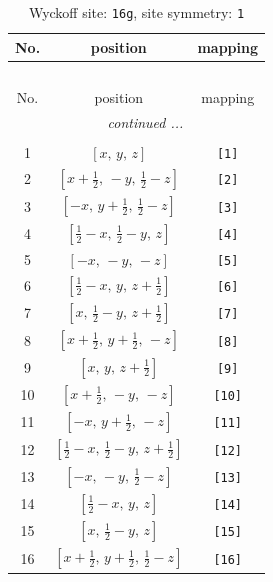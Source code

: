 \documentclass[fleqn,8pt]{jsarticle}
\begin{document}
\begin{longtable}{ccc}
\caption{Wyckoff site: {\tt 16g}, site symmetry: {\tt 1}}
 \\
 \hline \hline
No. & position & mapping \\ \hline \endfirsthead

\multicolumn{2}{l}{\tablename\ \thetable{}} \\
 \hline \hline
No. & position & mapping \\ \hline \endhead

 \hline \hline
\multicolumn{2}{r}{\footnotesize\it continued ...} \\ \endfoot

 \hline \hline
\multicolumn{2}{r}{} \\ \endlastfoot

1 & $\left[ x,\, y,\, z \right]$ & {\tt [1]} \\ \hline
2 & $\left[ x + \frac{1}{2},\, - y,\, \frac{1}{2} - z \right]$ & {\tt [2]} \\ \hline
3 & $\left[ - x,\, y + \frac{1}{2},\, \frac{1}{2} - z \right]$ & {\tt [3]} \\ \hline
4 & $\left[ \frac{1}{2} - x,\, \frac{1}{2} - y,\, z \right]$ & {\tt [4]} \\ \hline
5 & $\left[ - x,\, - y,\, - z \right]$ & {\tt [5]} \\ \hline
6 & $\left[ \frac{1}{2} - x,\, y,\, z + \frac{1}{2} \right]$ & {\tt [6]} \\ \hline
7 & $\left[ x,\, \frac{1}{2} - y,\, z + \frac{1}{2} \right]$ & {\tt [7]} \\ \hline
8 & $\left[ x + \frac{1}{2},\, y + \frac{1}{2},\, - z \right]$ & {\tt [8]} \\ \hline
9 & $\left[ x,\, y,\, z + \frac{1}{2} \right]$ & {\tt [9]} \\ \hline
10 & $\left[ x + \frac{1}{2},\, - y,\, - z \right]$ & {\tt [10]} \\ \hline
11 & $\left[ - x,\, y + \frac{1}{2},\, - z \right]$ & {\tt [11]} \\ \hline
12 & $\left[ \frac{1}{2} - x,\, \frac{1}{2} - y,\, z + \frac{1}{2} \right]$ & {\tt [12]} \\ \hline
13 & $\left[ - x,\, - y,\, \frac{1}{2} - z \right]$ & {\tt [13]} \\ \hline
14 & $\left[ \frac{1}{2} - x,\, y,\, z \right]$ & {\tt [14]} \\ \hline
15 & $\left[ x,\, \frac{1}{2} - y,\, z \right]$ & {\tt [15]} \\ \hline
16 & $\left[ x + \frac{1}{2},\, y + \frac{1}{2},\, \frac{1}{2} - z \right]$ & {\tt [16]} \\
\end{longtable}
\end{document}
